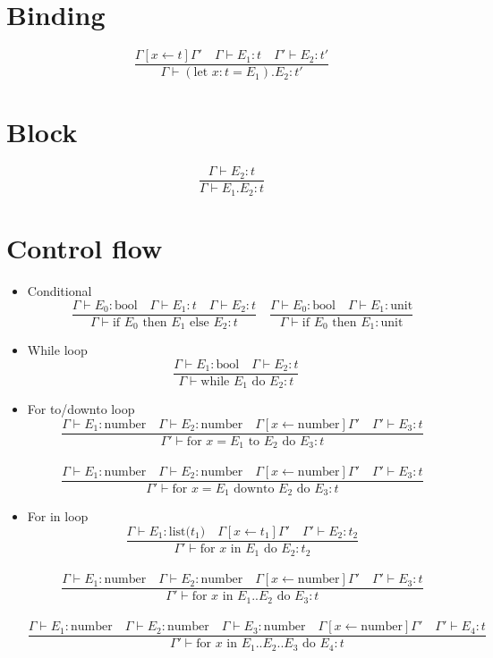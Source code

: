 \documentclass[]{article}
\begin{document}
	\section{Binding}
		\[
		\frac{\Gamma[x \leftarrow t]\Gamma' \quad \Gamma \vdash E_1: t \quad \Gamma' \vdash E_2: t'}{\Gamma \vdash (\text{let } x : t = E_1).E_2: t'}
		\]
	
	\section{Block}
		\[
		\frac{\Gamma \vdash E_2: t}{\Gamma \vdash E_1.E_2: t}
		\]
	
	\section{Control flow}
		\begin{itemize}
			\item Conditional
			\[
			\frac{\Gamma \vdash E_0: \text{bool} \quad \Gamma \vdash E_1: t \quad \Gamma \vdash E_2: t}{\Gamma \vdash \text{if } E_0 \text{ then } E_1 \text{ else } E_2:t} \quad
			\frac{\Gamma \vdash E_0: \text{bool} \quad \Gamma \vdash E_1: \text{unit}}{\Gamma \vdash \text{if } E_0 \text{ then } E_1 : \text{unit}}
			\]
			\item While loop
			\[
			\frac{\Gamma \vdash E_1: \text{bool} \quad \Gamma \vdash E_2: t}{\Gamma \vdash \text{while } E_1 \text{ do } E_2:t} \quad
			\]
			\item For to/downto loop
			\[
			\frac{\Gamma \vdash E_1: \text{number} \quad \Gamma \vdash E_2: \text{number} \quad \Gamma[x \leftarrow \text{number}]\Gamma' \quad \Gamma' \vdash E_3: t}{\Gamma' \vdash \text{for } x = E_1 \text{ to } E_2 \text{ do } E_3 :t}
			\]\\
			\[
			\frac{\Gamma \vdash E_1: \text{number} \quad \Gamma \vdash E_2: \text{number} \quad \Gamma[x \leftarrow \text{number}]\Gamma' \quad \Gamma' \vdash E_3: t}{\Gamma' \vdash \text{for } x = E_1 \text{ downto } E_2 \text{ do } E_3 :t}
			\]
			\item For in loop
			\[
			\frac{\Gamma \vdash E_1: \text{list($t_1$)} \quad \Gamma[x \leftarrow t_1]\Gamma' \quad \Gamma' \vdash E_2: t_2}{\Gamma' \vdash \text{for } x \text{ in } E_1 \text{ do } E_2 :t_2}
			\]\\
			\[
			\frac{\Gamma \vdash E_1: \text{number} \quad \Gamma \vdash E_2: \text{number} \quad \Gamma[x \leftarrow \text{number}]\Gamma' \quad \Gamma' \vdash E_3: t}{\Gamma' \vdash \text{for } x \text{ in } E_1..E_2 \text{ do } E_3 :t}
			\]\\
			\[
			\frac{\Gamma \vdash E_1: \text{number} \quad \Gamma \vdash E_2: \text{number} \quad \Gamma \vdash E_3: \text{number} \quad \Gamma[x \leftarrow \text{number}]\Gamma' \quad \Gamma' \vdash E_4: t}{\Gamma' \vdash \text{for } x \text{ in } E_1..E_2..E_3 \text{ do } E_4 :t}
			\]\\
		\end{itemize}
	
\end{document}
